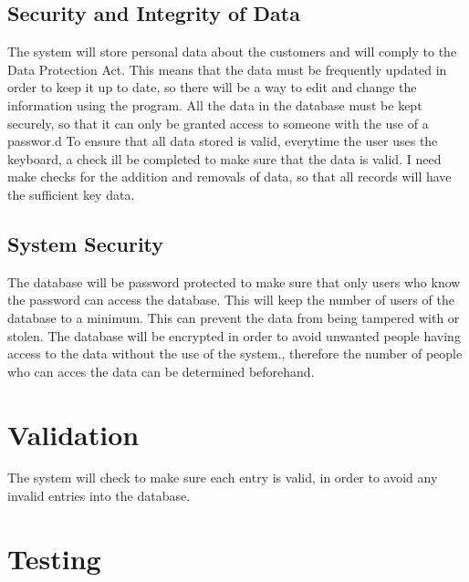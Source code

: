 \subsection{Security and Integrity of Data}
The system will store personal data about the customers and will comply to the Data Protection Act. This means that the data must be frequently updated in order to keep it up to date, so there will be a way to edit and change the information using the program. All the data in the database must be kept securely, so that it can only be granted access to someone with the use of a passwor.d To ensure that all data stored is valid, everytime the user uses the keyboard, a check ill be completed to make sure that the data is valid. I need make checks for the addition and removals of data, so that all records will have the sufficient key data.

\subsection{System Security}

The database will be password protected to make sure that only users who know the password can access the database. This will keep the number of users of the database to a minimum. This can prevent the data from being tampered with or stolen. The database will be encrypted in order to avoid unwanted people having access to the data without the use of the system., therefore the number of people who can acces the data can be determined beforehand.

\section{Validation}

The system will check to make sure each entry is valid, in order to avoid any invalid entries into the database. 


\section{Testing}


